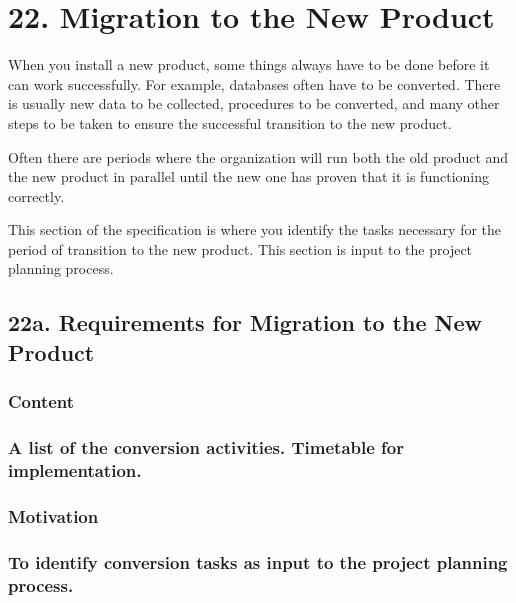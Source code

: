\documentclass[
]{article}
\begin{document}
\hypertarget{migration-to-the-new-product}{%
\section{22. Migration to the New
Product}\label{migration-to-the-new-product}}

When you install a new product, some things always have to be done
before it can work successfully. For example, databases often have to be
converted. There is usually new data to be collected, procedures to be
converted, and many other steps to be taken to ensure the successful
transition to the new product.

Often there are periods where the organization will run both the old
product and the new product in parallel until the new one has proven
that it is functioning correctly.

This section of the specification is where you identify the tasks
necessary for the period of transition to the new product. This section
is input to the project planning process.

\hypertarget{a.-requirements-for-migration-to-the-new-product}{%
\subsection{22a. Requirements for Migration to the New
Product}\label{a.-requirements-for-migration-to-the-new-product}}

\hypertarget{content-71}{%
\subsubsection{Content}\label{content-71}}

\hypertarget{a-list-of-the-conversion-activities.-timetable-for-implementation.}{%
\subsubsection{A list of the conversion activities. Timetable for
implementation.}\label{a-list-of-the-conversion-activities.-timetable-for-implementation.}}

\hypertarget{motivation-70}{%
\subsubsection{Motivation}\label{motivation-70}}

\hypertarget{to-identify-conversion-tasks-as-input-to-the-project-planning-process.}{%
\subsubsection{To identify conversion tasks as input to the project
planning
process.}\label{to-identify-conversion-tasks-as-input-to-the-project-planning-process.}}
\end{document}
